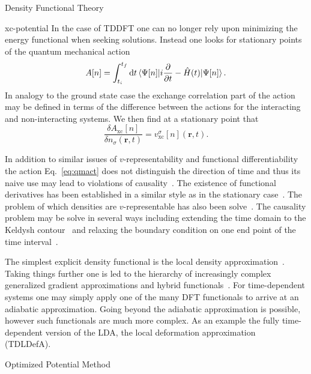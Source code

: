 \documentclass[letterpaper, 11 pt]{report}
\begin{document}
\begin{chapter}{Density Functional Theory \label{chap:dft}}
\begin{section}{xc-potential \label{sec:xcpot}}
      In the case of TDDFT one can no longer rely upon minimizing the energy functional when seeking
      solutions. Instead one looks for stationary points of the quantum mechanical
      action~\cite{qmaction} 
      \begin{equation} \label{eq:qmact}
         A[n] = \int^{t_f}_{t_i} \mathrm{d}t
            \braket{\Psi[n] |i\frac{\partial}{\partial t} -\hat{H}(t) | \Psi[n]}.
      \end{equation}
      In analogy to the ground state case the exchange correlation part of the action may be defined in
      terms of the difference between the actions for the interacting and non-interacting systems. We
      then find at a stationary point that
      \begin{equation} \label{eq:tdvxc-der}
         \frac{\delta A_\mathrm{xc}[n]}{\delta n_\sigma(\mathbf{r},t)}
            = v^\sigma_\mathrm{xc}[n](\mathbf{r},t).
      \end{equation}

      In addition to similar issues of $v$-representability and functional differentiability the action
      Eq.~\eqref{eq:qmact} does not distinguish the direction of time and thus its naive use may lead
      to violations of causality~\cite{tddft-causality}. The existence of functional derivatives has
      been established in a similar style as in the stationary case~\cite{td-welldef}. The problem of
      which densities are $v$-representable has also been solve~\cite{td-vrep}. The causality problem
      may be solve in several ways including extending the time domain to the Keldysh
      contour~\cite{caus-sol1} and relaxing the boundary condition on one end point of the time
      interval~\cite{caus-sol2}.

      The simplest explicit density functional is the local density approximation~\cite{ks-eq}. Taking
      things further one is led to the hierarchy of increasingly complex generalized gradient
      approximations and hybrid functionals~\cite{gga+}. For time-dependent systems one may simply apply
      one of the many DFT functionals to arrive at an adiabatic approximation. Going beyond the
      adiabatic approximation is possible, however such functionals are much more complex. As an example
      the fully time-dependent version of the LDA, the local deformation approximation~\cite{TDLDefA1,
      TDLDefA2} (TDLDefA).

      \begin{subsection}{Optimized Potential Method \label{sec:opm}}


\end{subsection}
\end{section}
\end{chapter}
\end{document}
